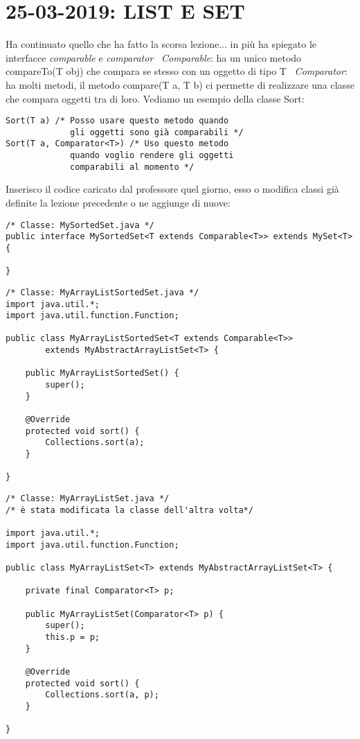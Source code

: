 

\newpage
\section{25-03-2019: LIST E SET}
\noindent Ha continuato quello che ha fatto la scorsa lezione... in più ha spiegato le interfacce \textit{comparable} e \textit{comparator} \newline 
\textbullet\ \textit{Comparable}: ha un unico metodo compareTo(T obj) che compara se stesso con un oggetto di tipo T \newline
\textbullet\ \textit{Comparator}: ha molti metodi, il metodo compare(T a, T b) ci permette di realizzare una classe che compara oggetti tra di loro. \newline
Vediamo un esempio della classe Sort: \newline
\begin{lstlisting}[basicstyle=\small,]
Sort(T a) /* Posso usare questo metodo quando 
			 gli oggetti sono già comparabili */
Sort(T a, Comparator<T>) /* Uso questo metodo 
		     quando voglio rendere gli oggetti
		     comparabili al momento */
\end{lstlisting}

Inserisco il codice caricato dal professore quel giorno, esso o modifica classi già definite la lezione precedente o ne aggiunge di nuove: 

\begin{lstlisting}[basicstyle=\small,]
/* Classe: MySortedSet.java */
public interface MySortedSet<T extends Comparable<T>> extends MySet<T> {

}
\end{lstlisting}

\begin{lstlisting}[basicstyle=\small,]
/* Classe: MyArrayListSortedSet.java */
import java.util.*;
import java.util.function.Function;

public class MyArrayListSortedSet<T extends Comparable<T>>
        extends MyAbstractArrayListSet<T> {

    public MyArrayListSortedSet() {
        super();
    }

    @Override
    protected void sort() {
        Collections.sort(a);
    }

}
\end{lstlisting}

\begin{lstlisting}[basicstyle=\small,]
/* Classe: MyArrayListSet.java */
/* è stata modificata la classe dell'altra volta*/

import java.util.*;
import java.util.function.Function;

public class MyArrayListSet<T> extends MyAbstractArrayListSet<T> {

    private final Comparator<T> p;

    public MyArrayListSet(Comparator<T> p) {
        super();
        this.p = p;
    }

    @Override
    protected void sort() {
        Collections.sort(a, p);
    }

}

\end{lstlisting}

